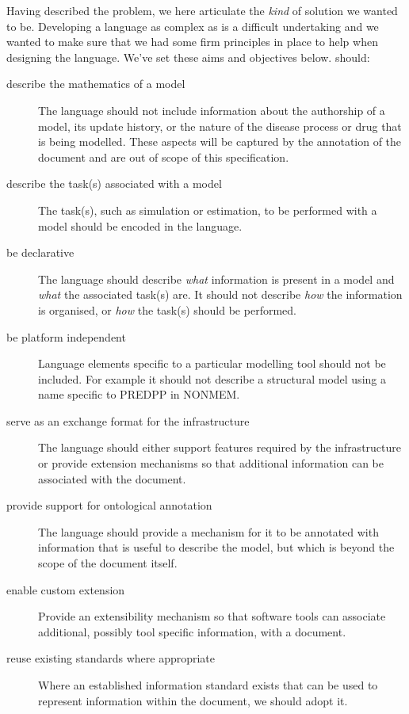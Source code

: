 Having described the problem, we here articulate the \emph{kind} of solution we wanted \pharmml to be.
Developing a language as complex as \pharmml is a difficult undertaking and we wanted to make sure
that we had some firm principles in place to help when designing the language. We've set these aims
and objectives below. \pharmml should:

\begin{description}
\item[describe the mathematics of a model] The language should not include 
information about the authorship of a model, its update history, or the nature 
of the disease process or drug that is being modelled. These aspects will be 
captured by the annotation of the \pharmml document and are out of scope 
of this specification.
\item[describe the task(s) associated with a model] The task(s), such as simulation 
or estimation, to be performed with a model should be encoded in the language.
\item[be declarative] The language should describe \emph{what} information is 
present in a model and \emph{what} the associated task(s) are. It should not 
describe \emph{how} the information is organised, or \emph{how} the task(s) 
should be performed.
\item[be platform independent] Language elements specific to a particular 
modelling tool should not be included. For example it should not describe 
a structural model using a name specific to PREDPP in NONMEM.
\item[serve as an exchange format for the \ddmore infrastructure] The language 
should either support features required by the infrastructure or provide extension 
mechanisms so that additional information can be associated with the \pharmml 
document.
\item[provide support for ontological annotation] The language should provide 
a mechanism for it to be annotated with information that is useful to describe 
the model, but which is beyond the scope of the \pharmml document itself.
\item[enable custom extension] Provide an extensibility mechanism so that 
software tools can associate additional, possibly tool specific information, 
with a \pharmml document.
\item[reuse existing standards where appropriate] Where an established 
information standard exists that can be used to represent information within 
the \pharmml document, we should adopt it.
\end{description}


